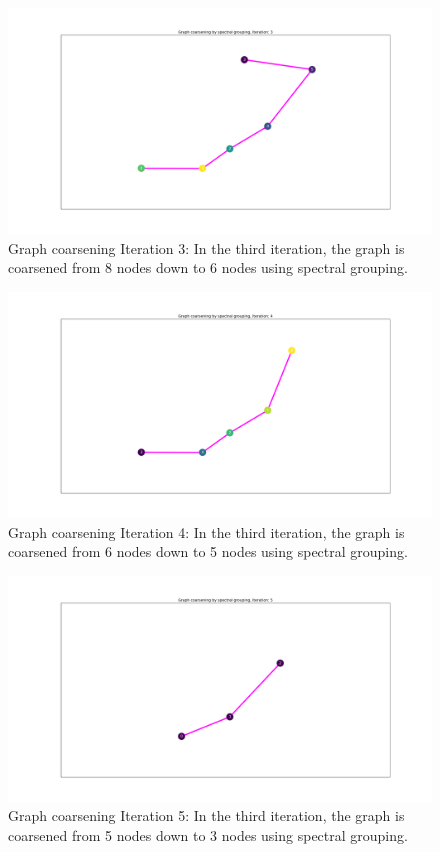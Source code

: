 \documentclass[11pt]{article}
\begin{document}
\begin{figure}[H]
\centering
\includegraphics[width=1\textwidth]{Figure_3.png}
\caption{Graph coarsening Iteration 3: In the third iteration, the graph is coarsened from 8 nodes down to 6 nodes using spectral grouping.\label{fig:Iteration3}}
\end{figure}

\begin{figure}[H]
\centering
\includegraphics[width=1\textwidth]{Figure_4.png}
\caption{Graph coarsening Iteration 4: In the third iteration, the graph is coarsened from 6 nodes down to 5 nodes using spectral grouping.\label{fig:Iteration4}}
\end{figure}

\begin{figure}[H]
\centering
\includegraphics[width=1\textwidth]{Figure_5.png}
\caption{Graph coarsening Iteration 5: In the third iteration, the graph is coarsened from 5 nodes down to 3 nodes using spectral grouping.\label{fig:Iteration5}}
\end{figure}
\end{document}
